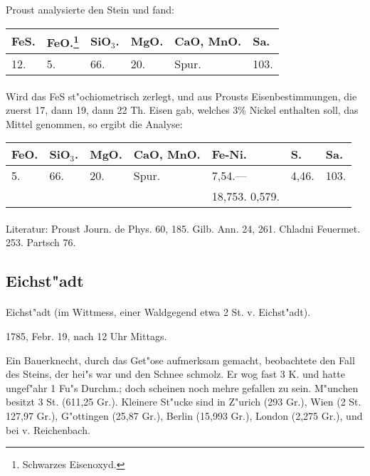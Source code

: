 \documentclass[a4paper, 11pt, oneside]{article}
\begin{document}
Proust analysierte den Stein und fand:

\begin{table}[!ht]
    \centering
    \begin{tabular}{l l l l l l}
        FeS. & FeO.\footnote{Schwarzes Eisenoxyd.} & SiO$_{3}$. & MgO. & CaO, MnO. & Sa. \\ \hline
        12. & 5. & 66. & 20. & Spur. & 103. \\
    \end{tabular}
\end{table}
\paragraph{}
Wird das FeS st"ochiometrisch zerlegt, und aus Prousts Eisenbestimmungen, die zuerst 17, dann 19, dann 22 Th. Eisen gab, welches 3\% Nickel enthalten soll, das Mittel genommen, so ergibt die Analyse:
\begin{table}[!ht]
    \centering
    \begin{tabular}{l l l l l l l}
        FeO. & SiO$_{3}$. & MgO. & CaO, MnO. & Fe-Ni. & S. & Sa. \\ \hline
        5. & 66. & 20. & Spur. & 7,54.--- & 4,46. & 103. \\
         &  &  &  & 18,753. 0,579. &  &
    \end{tabular}
\end{table}
\footnotesize
\paragraph{}
Literatur: Proust Journ. de Phys. 60, 185. Gilb. Ann. 24, 261. Chladni Feuermet. 253. Partsch 76.
\subsection{Eichst"adt}
\normalsize
\paragraph{}
Eichst"adt (im Wittmess, einer Waldgegend etwa 2 St. v. Eichst"adt).

1785, Febr. 19, nach 12 Uhr Mittags.

Ein Bauerknecht, durch das Get"ose aufmerksam gemacht, beobachtete den Fall des Steins, der hei"s war und den Schnee schmolz. Er wog fast 3 K. und hatte ungef"ahr 1 Fu"s Durchm.; doch scheinen noch mehre gefallen zu sein. M"unchen besitzt 3 St. (611,25 Gr.). Kleinere St"ucke sind in Z"urich (293 Gr.), Wien (2 St. 127,97 Gr.), G"ottingen (25,87 Gr.), Berlin (15,993 Gr.), London (2,275 Gr.), und bei v. Reichenbach.
\end{document}
